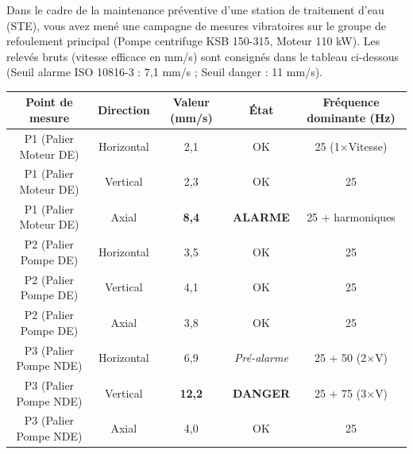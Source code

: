 \documentclass[11pt]{article}
\begin{document}
\begin{exercice}
Dans le cadre de la maintenance préventive d'une station de traitement d'eau (STE), vous avez mené une campagne de mesures vibratoires sur le groupe de refoulement principal (Pompe centrifuge KSB 150-315, Moteur 110 kW). Les relevés bruts (vitesse efficace en mm/s) sont consignés dans le tableau ci-dessous (Seuil alarme ISO 10816-3 : 7,1 mm/s ; Seuil danger : 11 mm/s).

\begin{center}
\begin{tabular}{|c|c|c|c|c|}
\hline
\textbf{Point de mesure} & \textbf{Direction} & \textbf{Valeur (mm/s)} & \textbf{État} & \textbf{Fréquence dominante (Hz)} \\
\hline
P1 (Palier Moteur DE) & Horizontal & 2,1 & OK & 25 (1$\times$Vitesse) \\
P1 (Palier Moteur DE) & Vertical & 2,3 & OK & 25 \\
P1 (Palier Moteur DE) & Axial & \textbf{8,4} & \textbf{ALARME} & 25 + harmoniques \\
\hline
P2 (Palier Pompe DE) & Horizontal & 3,5 & OK & 25 \\
P2 (Palier Pompe DE) & Vertical & 4,1 & OK & 25 \\
P2 (Palier Pompe DE) & Axial & 3,8 & OK & 25 \\
\hline
P3 (Palier Pompe NDE) & Horizontal & 6,9 & \textit{Pré-alarme} & 25 + 50 (2$\times$V) \\
P3 (Palier Pompe NDE) & Vertical & \textbf{12,2} & \textbf{DANGER} & 25 + 75 (3$\times$V) \\
P3 (Palier Pompe NDE) & Axial & 4,0 & OK & 25 \\
\hline
\end{tabular}
\end{center}


\end{exercice}
\end{document}
